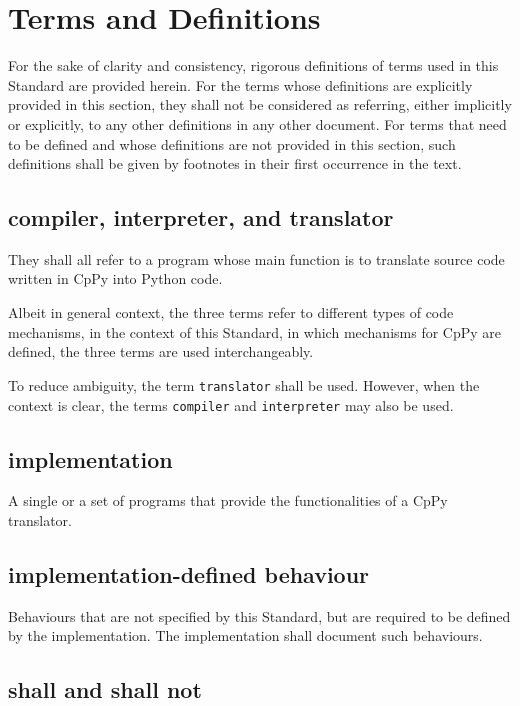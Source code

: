 \section{Terms and Definitions}

For the sake of clarity and consistency, rigorous definitions of terms used in this
Standard are provided herein. For the terms whose definitions are explicitly provided
in this section, they shall not be considered as referring, either implicitly or
explicitly, to any other definitions in any other document. For terms that need to be
defined and whose definitions are not provided in this section, such definitions shall
be given by footnotes in their first occurrence in the text.


\subsection{{\ttfamily compiler}, {\ttfamily interpreter}, and {\ttfamily translator}}

They shall all refer to a program whose main function is to translate source code written
in CpPy into Python code.

\inlinenote Albeit in general context, the three terms refer to different types of
code mechanisms, in the context of this Standard, in which mechanisms for CpPy are
defined, the three terms are used interchangeably.

\inlinenote To reduce ambiguity, the term \texttt{translator} shall be used. However,
when the context is clear, the terms \texttt{compiler} and \texttt{interpreter} may also
be used.


\subsection{{\ttfamily implementation}}

A single or a set of programs that provide the functionalities of a CpPy translator.


\subsection{{\ttfamily implementation-defined behaviour}}

Behaviours that are not specified by this Standard, but are required to be defined by
the implementation. The implementation shall document such behaviours.


\subsection{{\ttfamily shall} and {\ttfamily shall not}}

